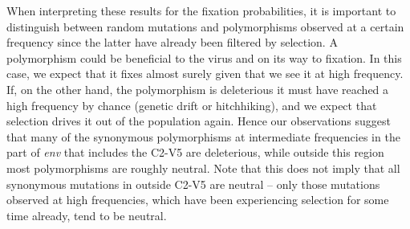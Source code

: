 \documentclass[rmp, twocolumn]{revtex4}
\newcommand{\env}{\textit{env}}
\newcommand{\shankaregion}{C2-V5}
\begin{document}
When interpreting these results for the fixation probabilities, it is important
to distinguish between random mutations and polymorphisms observed at a certain
frequency since the latter have already been filtered by selection.
A polymorphism could be beneficial to the virus and on its way to fixation. In
this case, we expect that it fixes almost surely given that we see it at high
frequency. If, on the other hand, the polymorphism is deleterious it must have
reached a high frequency by chance (genetic drift or hitchhiking), and
we expect that selection drives it out of the population again. Hence our
observations suggest that many of the synonymous polymorphisms at intermediate
frequencies in the part of \env{} that includes the \shankaregion{} are
deleterious, while outside this region most polymorphisms are roughly
neutral. Note that this does not imply that all synonymous mutations in outside 
\shankaregion{} are neutral -- only those mutations observed at high frequencies, which
have been experiencing selection for some time already, tend to be neutral.
\end{document}
